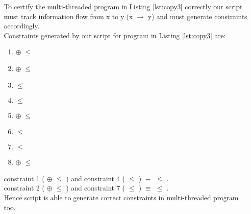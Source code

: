 To certify the multi-threaded program in Listing \ref{lst:copy3} correctly our script must track information flow from x to y (x $\rightarrow$ y) and must generate constraints accordingly.\\
Constraints generated by our script for program in Listing \ref{lst:copy3} are:
\begin{enumerate}
	\item {} $\oplus$  $\leqslant$  
	\item{} $\oplus$  $\leqslant$  
	\item{} $\leqslant$ 
	\item{} $\leqslant$ 
	\item{} $\oplus$  $\leqslant$  
	\item{} $\leqslant$ 
	\item{} $\leqslant$ 
	\item{} $\oplus$  $\leqslant$  
\end{enumerate}  
constraint 1 ( $\oplus$  $\leqslant$  ) and constraint 4 ( $\leqslant$ ) \hspace{1cm} $\equiv$ \hspace{1cm}  $\leqslant$ .\\
constraint 2 (  $\oplus$     $\leqslant$  ) and constraint 7 (  $\leqslant$ ) \hspace{1cm} $\equiv$ \hspace{1cm} 
 $\leqslant$ .\\	
Hence script is able to generate correct constraints in multi-threaded program too.


